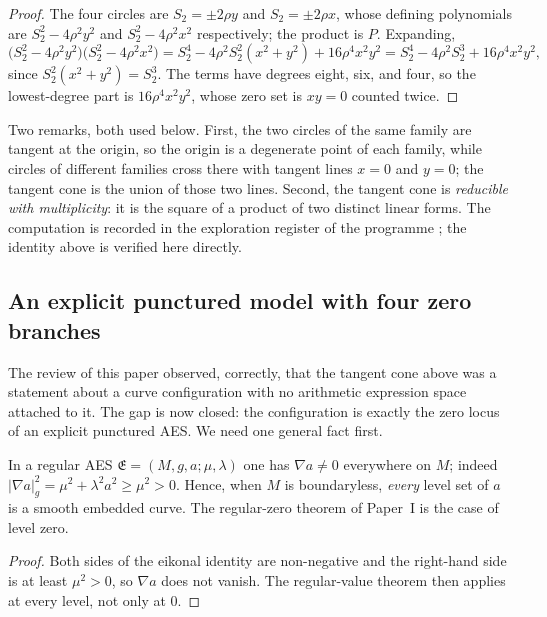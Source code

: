 \begin{proof}
The four circles are $S_2=\pm2\rho y$ and $S_2=\pm2\rho x$, whose defining
polynomials are $S_2^2-4\rho^2y^2$ and $S_2^2-4\rho^2x^2$ respectively; the
product is $P$.  Expanding,
\[
  \bigl(S_2^2-4\rho^2y^2\bigr)\bigl(S_2^2-4\rho^2x^2\bigr)
  =S_2^4-4\rho^2S_2^2(x^2+y^2)+16\rho^4x^2y^2
  =S_2^4-4\rho^2S_2^3+16\rho^4x^2y^2 ,
\]
since $S_2^2(x^2+y^2)=S_2^3$.  The terms have degrees eight, six, and four, so
the lowest-degree part is $16\rho^4x^2y^2$, whose zero set is $xy=0$ counted
twice.
\end{proof}

Two remarks, both used below.  First, the two circles of the same family are
tangent at the origin, so the origin is a degenerate point of each family, while
circles of different families cross there with tangent lines $x=0$ and $y=0$;
the tangent cone is the union of those two lines.  Second, the tangent cone is
\emph{reducible with multiplicity}: it is the square of a product of two distinct
linear forms.  The computation is recorded in the exploration register of the
programme \cite{Yuan2026AEGHoleRegister}; the identity above is verified here
directly.

\subsection{An explicit punctured model with four zero branches}
\label{subsec:p0-four-circle-model}

The review of this paper observed, correctly, that the tangent cone above was a
statement about a curve configuration with no arithmetic expression space
attached to it.  The gap is now closed: the configuration is exactly the zero
locus of an explicit punctured AES.  We need one general fact first.

\begin{lemma}
\label{lem:p0-gradient-nonvanishing}
In a regular AES $\mathfrak E=(M,g,a;\mu,\lambda)$ one has $\nabla a\ne0$
everywhere on $M$; indeed $|\nabla a|_g^2=\mu^2+\lambda^2a^2\ge\mu^2>0$.  Hence,
when $M$ is boundaryless, \emph{every} level set of $a$ is a smooth embedded
curve.  The regular-zero theorem of Paper~I is the case of level zero.
\end{lemma}

\begin{proof}
Both sides of the eikonal identity are non-negative and the right-hand side is at
least $\mu^2>0$, so $\nabla a$ does not vanish.  The regular-value theorem then
applies at every level, not only at $0$.
\end{proof}

